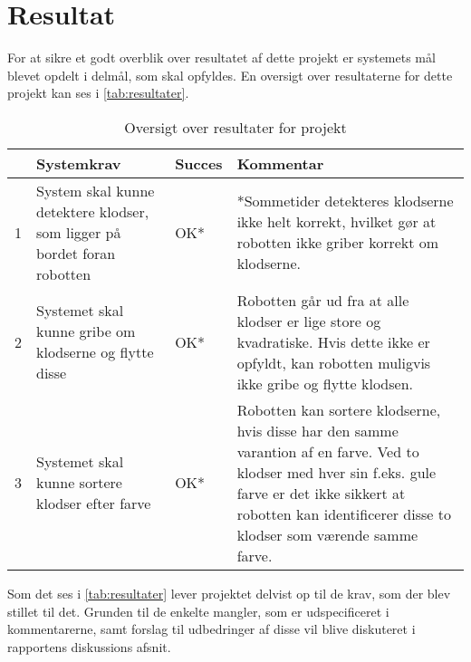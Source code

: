 \clearpage
\section{Resultat} %
\label{sec:resultat}

For at sikre et godt overblik over resultatet af dette projekt er systemets mål blevet opdelt i delmål, som skal opfyldes. En oversigt over resultaterne for dette projekt kan ses i \autoref{tab:resultater}.\\

\renewcommand{\arraystretch}{2}
\begin{table}[h]
	\centering
    \begin{tabular}{ | l | p{5cm} | l | p{7cm} |}
    \hline
      & Systemkrav & Succes & Kommentar \\ \hline
    1 & System skal kunne detektere klodser, som ligger på bordet foran robotten & OK* & *Sommetider detekteres klodserne ikke helt korrekt, hvilket gør at robotten ikke griber korrekt om klodserne. \\ \hline
    2 & Systemet skal kunne gribe om klodserne og flytte disse & OK* & Robotten går ud fra at alle klodser er lige store og kvadratiske. Hvis dette ikke er opfyldt, kan robotten muligvis ikke gribe og flytte klodsen. \\ \hline
    3 & Systemet skal kunne sortere klodser efter farve & OK* & Robotten kan sortere klodserne, hvis disse har den samme varantion af en farve. Ved to klodser med hver sin f.eks. gule farve er det ikke sikkert at robotten kan identificerer disse to klodser som værende samme farve. \\ \hline
    \end{tabular}
    \caption{Oversigt over resultater for projekt}
    \label{tab:resultater}
\end{table}

Som det ses i \autoref{tab:resultater} lever projektet delvist op til de krav, som der blev stillet til det. Grunden til de enkelte mangler, som er udspecificeret i kommentarerne, samt forslag til udbedringer af disse vil blive diskuteret i rapportens diskussions afsnit.

